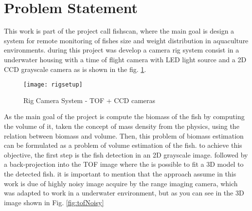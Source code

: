 

\section{Problem Statement}

This work is part of the project call fishscan, where the main goal is design a 
system for remote monitoring of fishes size and weight distribution in aquaculture 
environments. during this project was develop a camera rig system consist in a 
underwater housing with a time of flight camera with LED light source and a 2D CCD 
grayscale camera as is shown in the fig. \ref{fig:rigsetup}.

\begin{figure}[h]
\centering
\texttt{[image: rigsetup]}
\caption{Rig Camera System - TOF + CCD cameras}
\label{fig:rigsetup}
\end{figure}


As the main goal of the project is compute the biomass of the fish by computing 
the volume of it, taken the concept of mass density from the physics, using the relation
between biomass and volume. Then, this problem of biomass estimation can be formulated
as a problem of volume estimation of the fish. to achieve this objective, the first 
step is the fish detection in an 2D grayscale image. followed by a back-projection 
into the TOF image where the is possible to fit a 3D model to the detected fish.
it is important to mention that the approach assume in this work is due of highly 
noisy image acquire by the range imaging camera, which was adapted to work in a 
underwater environment, but as you can see in the 3D image shown in Fig. \ref{fig:tofNoisy}


